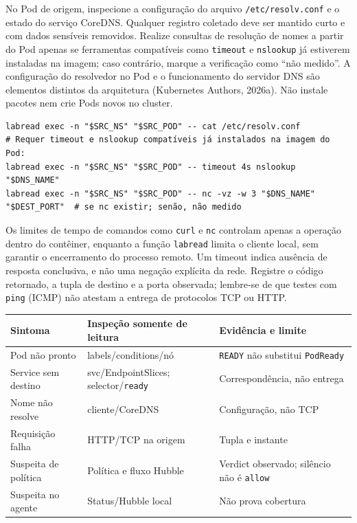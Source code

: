 \documentclass[12pt,openany,oneside,a4paper,chapter=TITLE,english,brazil]{abntex2}
\begin{document}
\begin{apendicesenv}
No Pod de origem, inspecione a configuração do arquivo \texttt{/\allowbreak{}etc/\allowbreak{}resolv.\allowbreak{}conf} e o estado do serviço CoreDNS. Qualquer registro coletado deve ser mantido curto e com dados sensíveis removidos. Realize consultas de resolução de nomes a partir do Pod apenas se ferramentas compatíveis como \texttt{timeout} e \texttt{nslookup} já estiverem instaladas na imagem; caso contrário, marque a verificação como ``não medido''. A configuração do resolvedor no Pod e o funcionamento do servidor DNS são elementos distintos da arquitetura (Kubernetes Authors, 2026a). Não instale pacotes nem crie Pods novos no cluster.

\begin{verbatim}
labread exec -n "$SRC_NS" "$SRC_POD" -- cat /etc/resolv.conf
# Requer timeout e nslookup compatíveis já instalados na imagem do Pod:
labread exec -n "$SRC_NS" "$SRC_POD" -- timeout 4s nslookup "$DNS_NAME"
labread exec -n "$SRC_NS" "$SRC_POD" -- nc -vz -w 3 "$DNS_NAME" "$DEST_PORT"  # se nc existir; senão, não medido
\end{verbatim}

Os limites de tempo de comandos como \texttt{curl} e \texttt{nc} controlam apenas a operação dentro do contêiner, enquanto a função \texttt{labread} limita o cliente local, sem garantir o encerramento do processo remoto. Um timeout indica ausência de resposta conclusiva, e não uma negação explícita da rede. Registre o código retornado, a tupla de destino e a porta observada; lembre-se de que testes com \texttt{ping} (ICMP) não atestam a entrega de protocolos TCP ou HTTP.

\begin{quadro}[!htbp]
\caption{Sintoma, inspeção e limite da evidência}
\footnotesize
\begin{tabularx}{\textwidth}{|>{\raggedright\arraybackslash\hsize=0.855\hsize}X|>{\raggedright\arraybackslash\hsize=1.030\hsize}X|>{\raggedright\arraybackslash\hsize=1.115\hsize}X|}
\hline
\textbf{Sintoma} & \textbf{Inspeção somente de leitura} & \textbf{Evidência e limite} \\
\hline
Pod não pronto & labels/conditions/nó & \texttt{READY} não substitui \texttt{Pod\allowbreak{}Ready} \\
\hline
Service sem destino & svc/EndpointSlices; selector/\texttt{ready} & Correspondência, não entrega \\
\hline
Nome não resolve & cliente/CoreDNS & Configuração, não TCP \\
\hline
Requisição falha & HTTP/TCP na origem & Tupla e instante \\
\hline
Suspeita de política & Política e fluxo Hubble & Verdict observado; silêncio não é \texttt{allow} \\
\hline
Suspeita no agente & Status/Hubble local & Não prova cobertura \\
\hline
\end{tabularx}
\end{quadro}


\end{apendicesenv}
\end{document}
